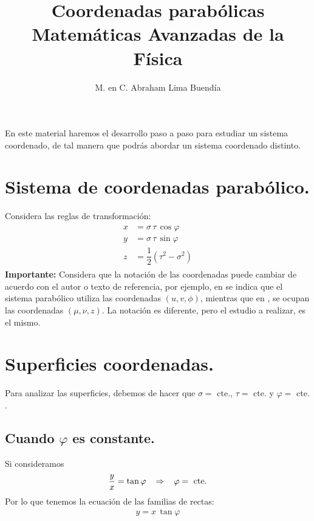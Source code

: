 
\title{Coordenadas parabólicas\\ \large{Matemáticas Avanzadas de la Física}\vspace{-3ex}}
\author{M. en C. Abraham Lima Buendía}
\date{ }

\vspace{-4cm}
\maketitle
\fontsize{14}{14}\selectfont
En este material haremos el desarrollo paso a paso para estudiar un sistema coordenado, de tal manera que podrás abordar un sistema coordenado distinto.
\section{Sistema de coordenadas parabólico.}
Considera las reglas de transformación:
\begin{align}
\begin{aligned}
x &= \sigma \, \tau \, \cos \varphi \\[0.5em]
y &= \sigma \, \tau \, \sin \varphi \\[0.5em]
z &= \dfrac{1}{2} (\tau^2 - \sigma^{2})
\end{aligned}
\label{eq:ecuacion_01}
\end{align}
\textbf{Importante: } Considera que la notación de las coordenadas puede cambiar de acuerdo con el autor o texto de referencia, por ejemplo, en \cite{Boas} se indica que el sistema parabólico utiliza las coordenadas $(u, v, \phi)$, mientras que en \cite{Moon}, se ocupan las coordenadas $(\mu, \nu, z)$. La notación es diferente, pero el estudio a realizar, es el mismo.
\section{Superficies coordenadas.}
Para analizar las superficies, debemos de hacer que $\sigma = \mbox{ cte.}$, $\tau = \mbox{ cte.}$ y $\varphi = \mbox{ cte.}$.
\subsection{Cuando $\varphi$ es constante.}
Si consideramos
\begin{align*}
\dfrac{y}{x} = \tan \varphi \hspace{0.3cm} \Rightarrow \hspace{0.3cm} \varphi = \mbox{ cte.}
\end{align*}
Por lo que tenemos la ecuación de las familias de rectas:
\begin{align*}
y = x \, \tan \varphi
\end{align*}
